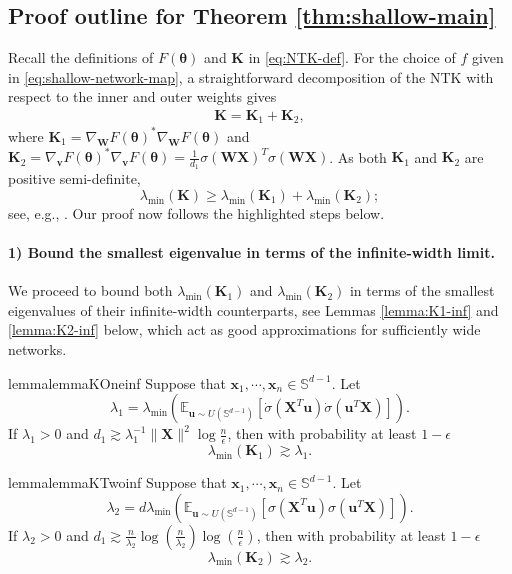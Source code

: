 \documentclass{article}
\theoremstyle{definition}
\newcommand{\E}{\mathbb{E}}
\renewcommand{\S}{\mathbb{S}}
\def\vtheta{{\bm{\theta}}}
\def\vu{{\bm{u}}}
\def\vv{{\bm{v}}}
\def\vx{{\bm{x}}}
\def\mK{{\bm{K}}}
\def\mW{{\bm{W}}}
\def\mX{{\bm{X}}}
\begin{document}
\subsection{Proof outline for Theorem \ref{thm:shallow-main}} \label{subsec:shallow-proof-outline}
Recall the definitions of $F(\vtheta)$ and $\mK$ in \eqref{eq:NTK-def}. For the choice of $f$ given in \eqref{eq:shallow-network-map}, a straightforward decomposition of the NTK with respect to the inner and outer weights gives
\begin{align} \label{eq:ntk-shallow-decomp}
    \mK = \mK_1 + \mK_2, 
\end{align}
where $\mK_1 = \nabla_{\mW} F(\vtheta )^* \nabla_{\mW} F(\vtheta )$ and $\mK_2 = \nabla_{\vv} F(\vtheta )^* \nabla_{\vv} F(\vtheta ) = \frac{1}{d_1}\sigma(\mW \mX)^T \sigma(\mW\mX)$. As both $\mK_1$ and $\mK_2$ are positive semi-definite, 
\begin{equation}
    \lambda_{\min}(\mK) \geq  \lambda_{\min}(\mK_1) +  \lambda_{\min}(\mK_2);
\end{equation}
see, e.g., \citet[Theorem 4.3.1]{Horn_Johnson_2012}. Our proof now follows the highlighted steps below.

\paragraph{1) Bound the smallest eigenvalue in terms of the infinite-width limit.}
We proceed to bound both $\lambda_{\min}(\mK_1)$ and $\lambda_{\min}(\mK_2)$
in terms of the smallest eigenvalues of their infinite-width counterparts, see Lemmas \ref{lemma:K1-inf} and \ref{lemma:K2-inf} below, which act as good approximations for sufficiently wide networks.


\begin{restatable}{lemma}{lemmaKOneinf}\label{lemma:K1-inf}
Suppose that $\vx_1, \cdots, \vx_n \in \S^{d - 1}$. Let
    \[\lambda_1 = \lambda_{\min}\left(\E_{\vu \sim U(\S^{d - 1}) } \left[\dot{\sigma}\left(\mX^T\vu \right)\dot{\sigma}\left(\vu^T\mX\right) \right] \right). \]
    If $\lambda_1 > 0$ and $d_1 \gtrsim \lambda_1^{-1}\|\mX\|^2 \log \frac{n}{\epsilon}$, then with probability at least $1 - \epsilon$ \[
    \lambda_{\min}(\mK_1) \gtrsim \lambda_1.
    \]
\end{restatable}

\begin{restatable}{lemma}{lemmaKTwoinf}\label{lemma:K2-inf}
    Suppose that $\vx_1, \cdots, \vx_n \in \S^{d - 1 }$. Let
    \[\lambda_2 = d \lambda_{\min}\left(\E_{\vu \sim U(\S^{d - 1}) }\left[\sigma(\mX^T \vu)\sigma(\vu^T \mX) \right] \right). \]
    If $\lambda_2 > 0$ and $d_1 \gtrsim  \frac{n}{\lambda_2}  \log\left(\frac{n}{\lambda_2}\right)\log \left(\frac{n}{\epsilon}\right) $, then with probability at least $1 - \epsilon$ \[\lambda_{\min}(\mK_2) \gtrsim 
\lambda_2.
 \] 
\end{restatable}
\end{document}
